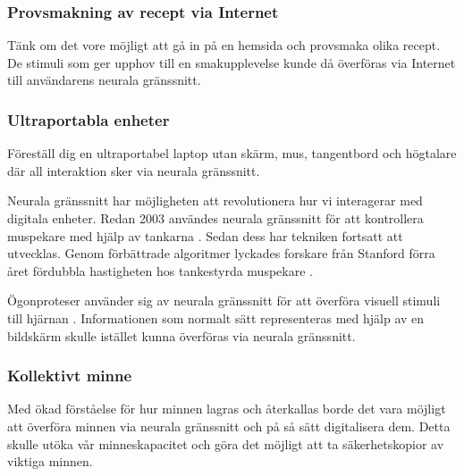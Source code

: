 \documentclass[12pt, a4paper]{article}
\begin{document}

\subsubsection{Provsmakning av recept via Internet}

Tänk om det vore möjligt att gå in på en hemsida och provsmaka olika recept. De stimuli som ger upphov till en smakupplevelse kunde då överföras via Internet till användarens neurala gränssnitt.


\subsubsection{Ultraportabla enheter}

Föreställ dig en ultraportabel laptop utan skärm, mus, tangentbord och högtalare där all interaktion sker via neurala gränssnitt.

Neurala gränssnitt har möjligheten att revolutionera hur vi interagerar med digitala enheter. Redan 2003 användes neurala gränssnitt för att kontrollera muspekare med hjälp av tankarna \cite{cursor1}. Sedan dess har tekniken fortsatt att utvecklas. Genom förbättrade algoritmer lyckades forskare från Stanford förra året fördubbla hastigheten hos tankestyrda muspekare \cite{fast_cursor}.

Ögonproteser använder sig av neurala gränssnitt för att överföra visuell stimuli till hjärnan \cite{prosthetic_operation}. Informationen som normalt sätt representeras med hjälp av en bildskärm skulle istället kunna överföras via neurala gränssnitt.

%
%


\subsubsection{Kollektivt minne}

Med ökad förståelse för hur minnen lagras och återkallas borde det vara möjligt att överföra minnen via neurala gränssnitt och på så sätt digitalisera dem. Detta skulle utöka vår minneskapacitet och göra det möjligt att ta säkerhetskopior av viktiga minnen.
\end{document}
